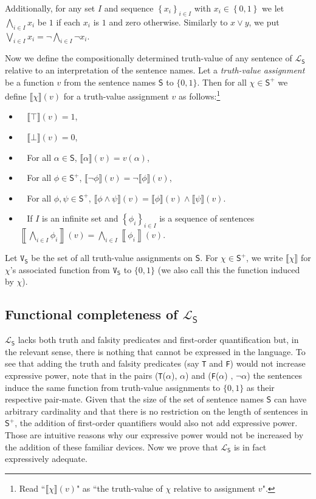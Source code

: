 \documentclass[12pt]{kluwer}
\theoremstyle{remark}
\newcommand{\fancy}[1]{\mathcal{#1}}
\def\S{\textsf{S}}
\def\V{\texttt{V}}
\def\L{\fancy{L}}
\newcommand{\eval}[2]{\left\llbracket #1 \right \rrbracket(#2)}
\newcommand{\set}[1]{\left\{ #1 \right\}}
\begin{document}
Additionally, for any set $I$ and sequence $\set{x_i}_{i \in I}$ with $x_i \in \set{0,1}$ we let $\bigwedge_{i \in I} x_i$ be $1$ if each $x_i$ is $1$ and zero otherwise.  Similarly to $x \vee y$, we put $\bigvee_{i \in I} x_i = \neg \bigwedge_{i \in I} \neg x_i$.\newline

Now we define the compositionally determined truth-value of any sentence of $\L_\S$ relative to an interpretation of the sentence names. Let a \textit{truth-value assignment} be a function $v$ from the sentence names $\S$ to $\{0,1\}$. Then for all $\chi \in \S^{+}$ we define $\llbracket \chi\rrbracket(v)$ for a truth-value assignment $v$ as follows:\footnote{Read ``$\llbracket \chi\rrbracket(v)$" as ``the truth-value of $\chi$ relative to assignment $v$".}

\begin{itemize}

\item $\;\;$ $\llbracket \top \rrbracket(v) =1$,
\item $\;\;$ $\llbracket \bot \rrbracket(v) =0$,
\item $\;\;$ For all $\alpha\in\S$,  $\llbracket \alpha \rrbracket(v) = v(\alpha)$,
\item $\;\;$ For all $\phi\in\S^{+}$, $\llbracket \neg\phi \rrbracket(v) = \neg \llbracket \phi \rrbracket(v)$,
\item $\;\;$ For all $\phi, \psi \in\S^{+}$, $\llbracket \phi \wedge \psi \rrbracket(v) = \llbracket \phi \rrbracket(v) \wedge \llbracket \psi \rrbracket(v)$.
\item $\;\;$ If $I$ is an infinite set and $\set{\phi_i}_{i \in I}$ is a sequence of sentences $\eval{\bigwedge_{i \in I} \phi_i}{v} = \bigwedge_{i \in I} \eval{\phi_i}{v}$.
\end{itemize}

Let $\V_\S$ be the set of all truth-value assignments on $\S$. For $\chi \in \S^{+}$, we write $\llbracket \chi\rrbracket$ for $\chi$'s associated function from $\V_\S$ to $\{0,1\}$ (we also call this the function induced by $\chi$).  

\subsection{Functional completeness of $\L_\S$}
\label{functcom}
$\L_\S$ lacks both truth and falsity predicates and first-order quantification but, in the relevant sense, there is nothing that cannot be expressed in the language. To see that adding the truth and falsity predicates (say \texttt{T} and \texttt{F}) would not increase expressive power, note that in the pairs (\texttt{T}($\alpha$), $\alpha$) and  (\texttt{F}($\alpha$) , $\neg \alpha$) the sentences induce the same function from truth-value assignments to $\{0,1\}$ as their respective pair-mate. Given that the size of the set of sentence names $\S$ can have arbitrary cardinality and that there is no restriction on the length of sentences in $\S^{+}$, the addition of first-order quantifiers would also not add expressive power. Those are intuitive reasons why our expressive power would not be increased by the addition of these familiar devices. Now we prove that $\L_\S$ is in fact expressively adequate.
\end{document}
